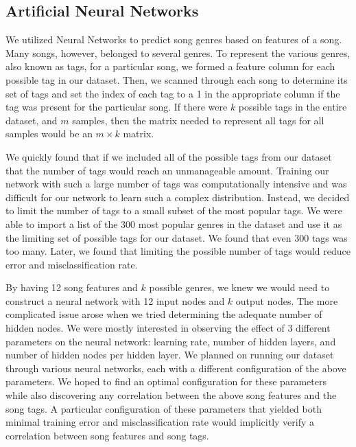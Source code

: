 \documentclass[12pt]{article}
\begin{document}
\subsection{Artificial Neural Networks}
\label{subsec:ann}
We utilized Neural Networks to predict song genres based on features of a song. Many songs, however, belonged to several genres. To represent the various genres, also known as tags, for a particular song, we formed a feature column for each possible tag in our dataset. Then, we scanned through each song to determine its set of tags and set the index of each tag to a 1 in the appropriate column if the tag was present for the particular song. If there were $k$ possible tags in the entire dataset, and $m$ samples, then the matrix needed to represent all tags for all samples would be an $m \times k$ matrix. 

We quickly found that if we included all of the possible tags from our dataset that the number of tags would reach an unmanageable amount. Training our network with such a large number of tags was computationally intensive and was difficult for our network to learn such a complex distribution. Instead, we decided to limit the number of tags to a small subset of the most popular tags. We were able to import a list of the 300 most popular genres in the dataset and use it as the limiting set of possible tags for our dataset. We found that even 300 tags was too many. Later, we found that limiting the possible number of tags would reduce error and misclassification rate.

By having 12 song features and $k$ possible genres, we knew we would need to construct a neural network with 12 input nodes and $k$ output nodes. The more complicated issue arose when we tried determining the adequate number of hidden nodes. We were mostly interested in observing the effect of 3 different parameters on the neural network: learning rate, number of hidden layers, and number of hidden nodes per hidden layer. We planned on running our dataset through various neural networks, each with a different configuration of the above parameters. We hoped to find an optimal configuration for these parameters while also discovering any correlation between the above song features and the song tags. A particular configuration of these parameters that yielded both minimal training error and misclassification rate would implicitly verify a correlation between song features and song tags.

\end{document}
